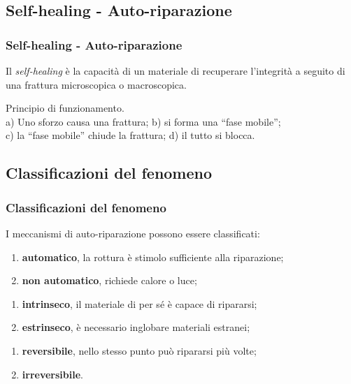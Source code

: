 \subsection{Self-healing - Auto-riparazione}
\begin{frame}\frametitle{Self-healing - Auto-riparazione}
    Il \emph{self-healing} è la capacità di un materiale di recuperare l'integrità a seguito di una frattura microscopica o macroscopica.
\begin{figure}{}\end{figure}
{\small Principio di funzionamento. \\ a) Uno sforzo causa una frattura; b) si forma una ``fase mobile'';\\ c) la ``fase mobile'' chiude la frattura;
d) il tutto si blocca.}
\end{frame}

\subsection{Classificazioni del fenomeno}\begin{frame}\frametitle{Classificazioni del fenomeno}
I meccanismi di auto-riparazione possono essere classificati:
\begin{enumerate}
 \item \textbf{automatico}, la rottura è stimolo sufficiente alla riparazione;
 \item \textbf{non automatico}, richiede calore o luce;
\end{enumerate}

\begin{enumerate}
 \item \textbf{intrinseco}, il materiale di per sé è capace di ripararsi;
 \item \textbf{estrinseco}, è necessario inglobare materiali estranei; 
\end{enumerate}

\begin{enumerate}
 \item \textbf{reversibile}, nello stesso punto può ripararsi più volte;
 \item \textbf{irreversibile}.
\end{enumerate}
\end{frame}


